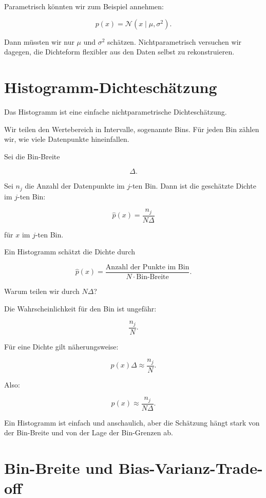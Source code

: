 Parametrisch könnten wir zum Beispiel annehmen:

\[
    p(x)
    =
    \mathcal{N}(x\mid\mu,\sigma^2).
\]

Dann müssten wir nur \(\mu\) und \(\sigma^2\) schätzen.
Nichtparametrisch versuchen wir dagegen, die Dichteform flexibler aus den Daten selbst zu rekonstruieren.

\section{Histogramm-Dichteschätzung}

Das Histogramm ist eine einfache nichtparametrische Dichteschätzung.

Wir teilen den Wertebereich in Intervalle, sogenannte Bins.
Für jeden Bin zählen wir, wie viele Datenpunkte hineinfallen.

Sei die Bin-Breite

\[
    \Delta.
\]

Sei \(n_j\) die Anzahl der Datenpunkte im \(j\)-ten Bin.
Dann ist die geschätzte Dichte im \(j\)-ten Bin:

\[
    \hat{p}(x)
    =
    \frac{n_j}{N\Delta}
\]

für \(x\) im \(j\)-ten Bin.

\begin{definitionbox}
Ein Histogramm schätzt die Dichte durch

\[
    \hat{p}(x)
    =
    \frac{\text{Anzahl der Punkte im Bin}}{N\cdot \text{Bin-Breite}}.
\]
\end{definitionbox}

Warum teilen wir durch \(N\Delta\)?

Die Wahrscheinlichkeit für den Bin ist ungefähr:

\[
    \frac{n_j}{N}.
\]

Für eine Dichte gilt näherungsweise:

\[
    p(x)\Delta
    \approx
    \frac{n_j}{N}.
\]

Also:

\[
    p(x)
    \approx
    \frac{n_j}{N\Delta}.
\]

\begin{notebox}
Ein Histogramm ist einfach und anschaulich, aber die Schätzung hängt stark von der Bin-Breite und von der Lage der Bin-Grenzen ab.
\end{notebox}

\section{Bin-Breite und Bias-Varianz-Trade-off}

